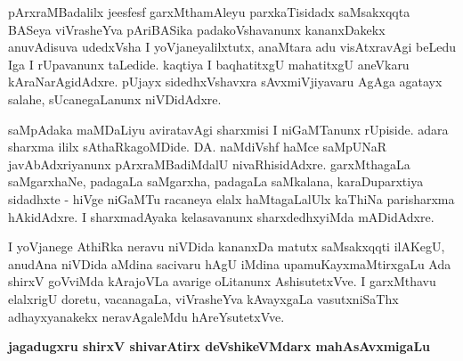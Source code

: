 \medskip

pArxraMBadalilx jeesfesf garxMthamAleyu parxkaTisidadx saMsakxqqta BASeya viVrasheYva pAriBASika padakoVshavanunx kananxDakekx anuvAdisuva udedxVsha I yoVjaneyalilxtutx, anaMtara adu visAtxravAgi beLedu Iga I rUpavanunx taLedide. kaqtiya I baqhatitxgU mahatitxgU aneVkaru kAraNarAgidAdxre. pUjayx sidedhxVshavxra sAvxmiVjiyavaru AgAga agatayx salahe, sUcanegaLanunx niVDidAdxre.

\medskip

saMpAdaka maMDaLiyu aviratavAgi sharxmisi I niGaMTanunx rUpiside. adara sharxma ililx sAthaRkagoMDide. DA. naMdiVshf haMce saMpUNaR javAbAdxriyanunx pArxraMBadiMdalU nivaRhisidAdxre. garxMthagaLa saMgarxhaNe, padagaLa saMgarxha, padagaLa saMkalana, karaDuparxtiya sidadhxte - hiVge niGaMTu racaneya elalx haMtagaLalUlx kaThiNa parisharxma hAkidAdxre. I sharxmadAyaka kelasavanunx sharxdedhxyiMda mADidAdxre. 
\medskip

I yoVjanege AthiRka neravu niVDida kananxDa matutx saMsakxqqti ilAKegU, anudAna niVDida aMdina sacivaru hAgU iMdina upamuKayxmaMtirxgaLu Ada shirxV goVviMda kArajoVLa avarige oLitanunx AshisutetxVve. I garxMthavu elalxrigU doretu, vacanagaLa, viVrasheYva kAvayxgaLa vasutxniSaThx adhayxyanakekx neravAgaleMdu hAreYsutetxVve.

\vskip 1cm

\hfill {\large\bf jagadugxru shirxV shivarAtirx deVshikeVMdarx mahAsAvxmigaLu}
